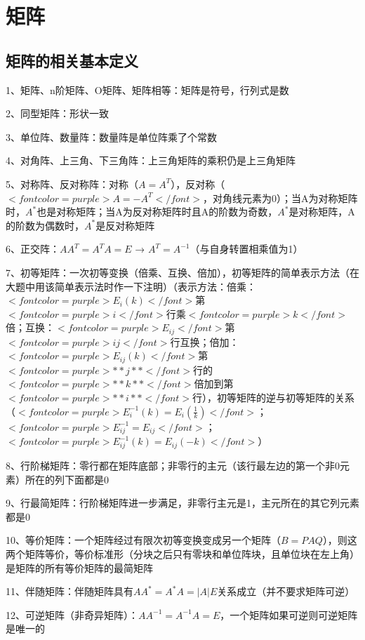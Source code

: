 \chapter{矩阵}

\section{矩阵的相关基本定义}

1、矩阵、n阶矩阵、O矩阵、矩阵相等：矩阵是符号，行列式是数

2、同型矩阵：形状一致

3、单位阵、数量阵：数量阵是单位阵乘了个常数

4、对角阵、上三角、下三角阵：上三角矩阵的乘积仍是上三角矩阵

5、对称阵、反对称阵：对称（$ A=A^T $），反对称（$ <font color=purple>A=-A^T</font> $，对角线元素为0）；当A为对称矩阵时，$ A^* $也是对称矩阵；当A为反对称矩阵时且A的阶数为奇数，$ A^* $是对称矩阵，A的阶数为偶数时，$ A^* $是反对称矩阵

6、正交阵：$ AA^T=A^TA=E $ → $ A^T = A^{-1} $（与自身转置相乘值为1）

7、初等矩阵：一次初等变换（倍乘、互换、倍加），初等矩阵的简单表示方法（在大题中用该简单表示法时作一下注明）（表示方法：倍乘：$ <font color=purple>E_{i}(k)</font> $第$ <font color=purple>i</font> $行乘$ <font color=purple>k</font> $倍；互换：$ <font color=purple>E_{ij}</font> $第$ <font color=purple>ij</font> $行互换；倍加：$ <font color=purple>E_{ij}(k)</font> $第$ <font color=purple>**j**</font> $行的$ <font color=purple>**k**</font> $倍加到第$ <font color=purple>**i**</font> $行），初等矩阵的逆与初等矩阵的关系（$ <font color=purple>E_{i}^{-1}(k)=E_{i}(\frac 1 k)</font> $；$ <font color=purple>E_{ij}^{-1}=E_{ij}</font> $；$ <font color=purple>E_{ij}^{-1}(k)=E_{ij}(-k)</font> $）

8、行阶梯矩阵：零行都在矩阵底部；非零行的主元（该行最左边的第一个非0元素）所在的列下面都是0

9、行最简矩阵：行阶梯矩阵进一步满足，非零行主元是1，主元所在的其它列元素都是0

10、等价矩阵：一个矩阵经过有限次初等变换变成另一个矩阵（$ B=PAQ $），则这两个矩阵等价，等价标准形（分块之后只有零块和单位阵块，且单位块在左上角）是矩阵的所有等价矩阵的最简矩阵

11、伴随矩阵：伴随矩阵具有$ AA^*=A^*A=|A|E $关系成立（并不要求矩阵可逆）

12、可逆矩阵（非奇异矩阵）：$ AA^{-1}=A^{-1}A=E $，一个矩阵如果可逆则可逆矩阵是唯一的

